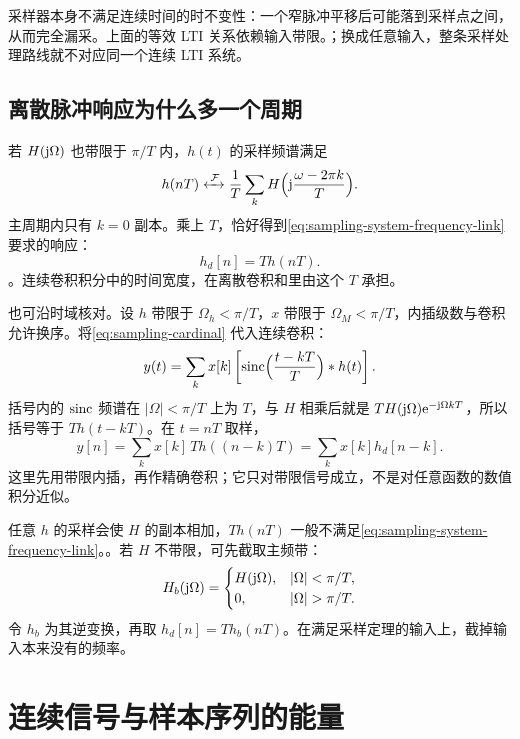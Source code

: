采样器本身不满足连续时间的时不变性：一个窄脉冲平移后可能落到采样点之间，从而完全漏采。上面的等效 LTI 关系依赖输入带限。；换成任意输入，整条采样处理路线就不对应同一个连续 LTI 系统。

\subsection{离散脉冲响应为什么多一个周期}
\label{subsec:sampling-impulse-response-link}

若 $H(\mathrm{j}\Omega)$ 也带限于 $\pi/T$ 内，$h(t)$ 的采样频谱满足
\[
  h(nT)\mathrel{\xleftrightarrow{\,\mathcal{F}\,}}
  \frac1T\sum_k H\Bigl(\mathrm{j}\frac{\omega-2\pi k}{T}\Bigr).
\]
主周期内只有 $k=0$ 副本。乘上 $T$，恰好得到\cref{eq:sampling-system-frequency-link} 要求的响应：
\begin{equation}
  h_d[n]=T h(nT).
  \label{eq:sampling-discrete-impulse-response}
\end{equation}
。连续卷积积分中的时间宽度，在离散卷积和里由这个 $T$ 承担。

也可沿时域核对。设 $h$ 带限于 $\Omega_h<\pi/T$，$x$ 带限于 $\Omega_M<\pi/T$，内插级数与卷积允许换序。将\cref{eq:sampling-cardinal} 代入连续卷积：
\[
  y(t)=\sum_k x[k]\left[
    \operatorname{sinc}\Bigl(\frac{t-kT}{T}\Bigr)\mathbin{\ast} h(t)\right].
\]
括号内的 $\operatorname{sinc}$ 频谱在 $|\Omega|<\pi/T$ 上为 $T$，与 $H$ 相乘后就是 $T H(\mathrm{j}\Omega)\mathrm{e}^{-\mathrm{j}\Omega kT}$，所以括号等于 $T h(t-kT)$。在 $t=nT$ 取样，
\[
  y[n]=\sum_k x[k]\,T h((n-k)T)
      =\sum_k x[k]h_d[n-k].
\]
这里先用带限内插，再作精确卷积；它只对带限信号成立，不是对任意函数的数值积分近似。

\begin{pitfall}[直接采样任意脉冲响应]
  任意 $h$ 的采样会使 $H$ 的副本相加，$T h(nT)$ 一般不满足\cref{eq:sampling-system-frequency-link}。。若 $H$ 不带限，可先截取主频带：
  \[
    H_b(\iu\Omega)=
    \begin{cases}
      H(\iu\Omega),&|\Omega|<\pi/T,\\
      0,&|\Omega|>\pi/T.
    \end{cases}
  \]
  令 $h_b$ 为其逆变换，再取 $h_d[n]=T h_b(nT)$。在满足采样定理的输入上，截掉输入本来没有的频率。
\end{pitfall}

\section{连续信号与样本序列的能量}
\label{sec:sampling-energy}

